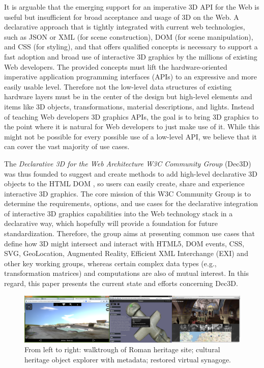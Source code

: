 \documentclass[review]{acmsiggraph}
\begin{document}
It is arguable that the emerging support for an imperative 3D API for the Web is useful but insufficient for broad acceptance and usage of 3D on the Web. A declarative approach that is tightly integrated with current web technologies, such as JSON or XML (for scene construction), DOM (for scene manipulation), and CSS (for styling), and that offers qualified concepts is necessary to support a fast adoption and broad use of interactive 3D graphics by the millions of existing Web developers. The provided concepts must lift the hardware-oriented imperative application programming interfaces (APIs) to an expressive and more easily usable level. Therefore not the low-level data structures of existing hardware layers must be in the center of the design but high-level elements and items like 3D objects, transformations, material descriptions, and lights. Instead of teaching Web developers 3D graphics APIs, the goal is to bring 3D graphics to the point where it is natural for Web developers to just make use of it. While this might not be possible for every possible use of a low-level API, we believe that it can cover the vast majority of use cases.

The \textit{Declarative 3D for the Web Architecture W3C Community Group} (Dec3D) \cite{Dec3D-CG} was thus founded to suggest and create methods to add high-level declarative 3D objects to the HTML DOM \cite{W3C-DOM}, so users can easily create, share and experience interactive 3D graphics. The core mission of this W3C Community Group is to determine the requirements, options, and use cases for the declarative integration of interactive 3D graphics capabilities into the Web technology stack in a declarative way, which hopefully will provide a foundation for future standardization.
Therefore, the group aims at presenting common use cases that define how 3D might intersect and interact with HTML5, DOM events, CSS, SVG, GeoLocation, Augmented Reality, Efficient XML Interchange (EXI) and other key working groups, whereas certain complex data types (e.g., transformation matrices) and computations are also of mutual interest. In this regard, this paper presents the current state and efforts concerning Dec3D.

\begin{figure}%
  \centering
  \includegraphics[width=1.0\textwidth]{images/ch_apps.png}
  \caption{From left to right: walktrough of Roman heritage site; cultural heritage object explorer with metadata; restored virtual synagoge.}
  \label{fig:chApps}
\end{figure}
\end{document}
